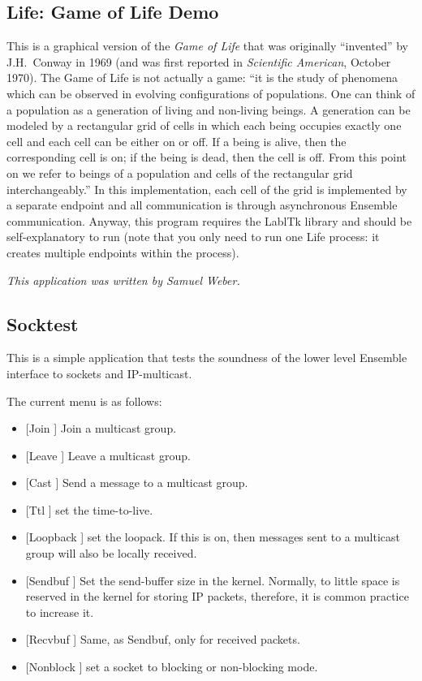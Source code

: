 \subsection{Life: Game of Life Demo}
This is a graphical version of the \emph{Game of Life} that was
originally ``invented'' by J.H.~Conway in 1969 (and was first
reported in \emph{Scientific American}, October 1970).  The Game of
Life is not actually a game: ``it is the study of phenomena which can
be observed in evolving configurations of populations.  One can think
of a population as a generation of living and non-living beings.  A
generation can be modeled by a rectangular grid of cells in which
each being occupies exactly one cell and each cell can be either on
or off.  If a being is alive, then the corresponding cell is on; if
the being is dead, then the cell is off.  From this point on we refer
to beings of a population and cells of the rectangular grid
interchangeably.''  In this implementation, each cell of the grid is
implemented by a separate endpoint and all communication is through
asynchronous Ensemble communication.  Anyway, this program requires
the LablTk library and should be self-explanatory to run (note that
you only need to run one Life process: it creates multiple endpoints
within the process).

\emph{This application was written by Samuel Weber.}

\subsection{Socktest}
This is a simple application that tests the soundness of the
lower level Ensemble interface to sockets and IP-multicast.

The current menu is as follows:
\begin{itemize}
\item
{[Join  ]} Join a multicast group.
\item 
{[Leave  ]} Leave a multicast group.
\item 
{[Cast  ]} Send a message to a multicast
group.
\item 
{[Ttl  ]} set the time-to-live.
\item 
{[Loopback  ]} set the loopack. If this is on, then
messages sent to a multicast group will also be locally received.
\item 
{[Sendbuf  ]} Set the send-buffer size in the kernel.
Normally, to little space is reserved in the kernel for storing IP
packets, therefore, it is common practice to increase it.
\item 
{[Recvbuf ]} 
Same, as Sendbuf, only for received packets.
\item 
{[Nonblock  ]} set a socket to blocking or non-blocking
mode.
\end{itemize}



